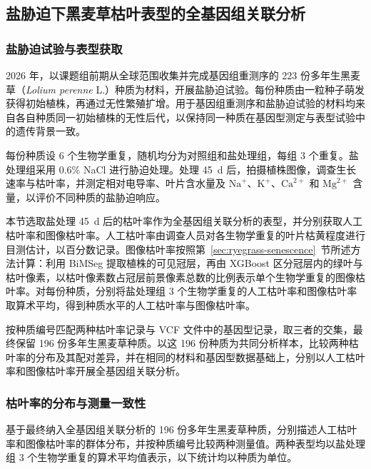 \subsection{盐胁迫下黑麦草枯叶表型的全基因组关联分析}
\label{sec:ryegrass-salt-gwas}

\subsubsection{盐胁迫试验与表型获取}
\label{sec:ryegrass-salt-phenotyping}

2026 年，以课题组前期从全球范围收集并完成基因组重测序的 223 份多年生黑麦草（\textit{Lolium perenne} L.）种质为材料，开展盐胁迫试验。每份种质由一粒种子萌发获得初始植株，再通过无性繁殖扩增。用于基因组重测序和盐胁迫试验的材料均来自各自种质同一初始植株的无性后代，以保持同一种质在基因型测定与表型试验中的遗传背景一致。

每份种质设 6 个生物学重复，随机均分为对照组和盐处理组，每组 3 个重复。盐处理组采用 0.6\% NaCl 进行胁迫处理。处理 45~d 后，拍摄植株图像，调查生长速率与枯叶率，并测定相对电导率、叶片含水量及 \(\mathrm{Na}^{+}\)、\(\mathrm{K}^{+}\)、\(\mathrm{Ca}^{2+}\) 和 \(\mathrm{Mg}^{2+}\) 含量，以评价不同种质的盐胁迫响应。

本节选取盐处理 45~d 后的枯叶率作为全基因组关联分析的表型，并分别获取人工枯叶率和图像枯叶率。人工枯叶率由调查人员对各生物学重复的叶片枯黄程度进行目测估计，以百分数记录。图像枯叶率按照第~\ref{sec:ryegrass-senescence}~节所述方法计算：利用 BiMSeg 提取植株的可见冠层，再由 XGBoost 区分冠层内的绿叶与枯叶像素，以枯叶像素数占冠层前景像素总数的比例表示单个生物学重复的图像枯叶率。对每份种质，分别将盐处理组 3 个生物学重复的人工枯叶率和图像枯叶率取算术平均，得到种质水平的人工枯叶率与图像枯叶率。

按种质编号匹配两种枯叶率记录与 VCF 文件中的基因型记录，取三者的交集，最终保留 196 份多年生黑麦草种质。以这 196 份种质为共同分析样本，比较两种枯叶率的分布及其配对差异，并在相同的材料和基因型数据基础上，分别以人工枯叶率和图像枯叶率开展全基因组关联分析。

\subsubsection{枯叶率的分布与测量一致性}
\label{sec:ryegrass-salt-phenotype-comparison}

基于最终纳入全基因组关联分析的 196 份多年生黑麦草种质，分别描述人工枯叶率和图像枯叶率的群体分布，并按种质编号比较两种测量值。两种表型均以盐处理组 3 个生物学重复的算术平均值表示，以下统计均以种质为单位。


